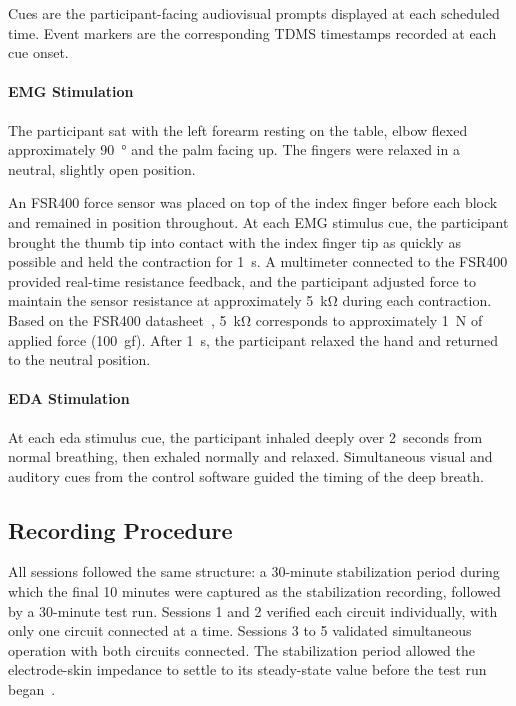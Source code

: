 Cues are the participant-facing audiovisual prompts displayed at each scheduled time. Event markers are the corresponding TDMS timestamps recorded at each cue onset.

\paragraph{EMG Stimulation}
The participant sat with the left forearm resting on the table, elbow flexed approximately \SI{90}{\degree} and the palm facing up. The fingers were relaxed in a neutral, slightly open position. 

An FSR400 force sensor was placed on top of the index finger before each block and remained in position throughout. At each EMG stimulus cue, the participant brought the thumb tip into contact with the index finger tip as quickly as possible and held the contraction for \SI{1}{\second}. A multimeter connected to the FSR400 provided real-time resistance feedback, and the participant adjusted force to maintain the sensor resistance at approximately \SI{5}{\kilo\ohm} during each contraction. Based on the FSR400 datasheet~\cite{inc_fsr_nodate}, \SI{5}{\kilo\ohm} corresponds to approximately \SI{1}{\newton} of applied force (100~gf). After \SI{1}{\second}, the participant relaxed the hand and returned to the neutral position.

\paragraph{EDA Stimulation}
At each \gls{eda} stimulus cue, the participant inhaled deeply over 2~seconds from normal breathing, then exhaled normally and relaxed. Simultaneous visual and auditory cues from the control software guided the timing of the deep breath.

\subsection{Recording Procedure}

All sessions followed the same structure: a 30-minute stabilization period during which the final 10 minutes were captured as the stabilization recording, followed by a 30-minute test run. Sessions 1 and 2 verified each circuit individually, with only one circuit connected at a time. Sessions 3 to 5 validated simultaneous operation with both circuits connected. The stabilization period allowed the electrode-skin impedance to settle to its steady-state value before the test run began~\cite{boucsein_electrodermal_2012}.

